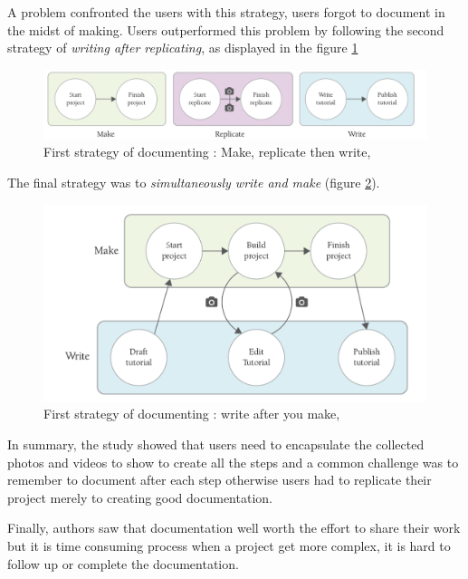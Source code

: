 A problem confronted the users with this strategy, users forgot to document in the midst of making. Users outperformed this problem by following the second strategy of \textit{writing after replicating}, as displayed in the figure \ref{img-makereplicatewrite} \cite{scholar:Tseng:2014:PVP:2598510.2598540}
\begin{figure}[ht!]
	\includegraphics[scale=0.34]{./images/img-makereplicatewrite.png}
	\caption{First strategy of documenting : Make, replicate  then write, \cite{tseng2016making}}
	\label{img-makereplicatewrite}
\end{figure}

The final strategy was to \textit{simultaneously write and make} (figure \ref{img-makewritesimultanously}). 
\begin{figure}[ht!]
	\includegraphics[scale=0.34]{./images/img-makewritesimultanously}
	\caption{First strategy of documenting : write after you make, \cite{tseng2016making}}
	\label{img-makewritesimultanously}
\end{figure}

In summary, the study showed that users need to encapsulate the collected photos and videos to show to create all the steps and a common challenge was to remember to document after each step otherwise users had to replicate their project merely to creating good documentation. 

Finally, authors saw that documentation well worth the effort to share their work but it is time consuming process when a project get more complex, it is hard to follow up or complete the documentation. \cite{scholar:Wakkary:2015:TAH:2702123.2702550}

